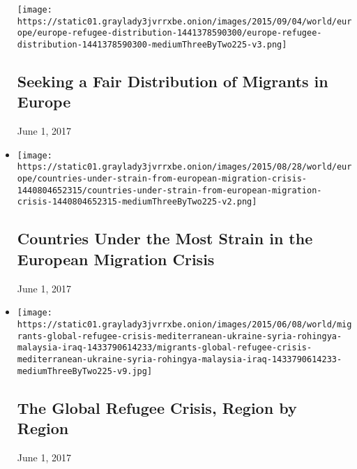 \begin{itemize}
  \texttt{[image: https://static01.graylady3jvrrxbe.onion/images/2015/09/04/world/europe/europe-refugee-distribution-1441378590300/europe-refugee-distribution-1441378590300-mediumThreeByTwo225-v3.png]}

  \hypertarget{seeking-a-fair-distribution-of-migrants-in-europe}{%
  \subsection{Seeking a Fair Distribution of Migrants in
  Europe}\label{seeking-a-fair-distribution-of-migrants-in-europe}}

  June 1, 2017
\item
  \href{https://www.nytimes3xbfgragh.onion/interactive/2015/08/28/world/europe/countries-under-strain-from-european-migration-crisis.html}{}

  \texttt{[image: https://static01.graylady3jvrrxbe.onion/images/2015/08/28/world/europe/countries-under-strain-from-european-migration-crisis-1440804652315/countries-under-strain-from-european-migration-crisis-1440804652315-mediumThreeByTwo225-v2.png]}

  \hypertarget{countries-under-the-most-strain-in-the-european-migration-crisis}{%
  \subsection{Countries Under the Most Strain in the European Migration
  Crisis}\label{countries-under-the-most-strain-in-the-european-migration-crisis}}

  June 1, 2017
\item
  \href{https://www.nytimes3xbfgragh.onion/interactive/2015/06/09/world/migrants-global-refugee-crisis-mediterranean-ukraine-syria-rohingya-malaysia-iraq.html}{}

  \texttt{[image: https://static01.graylady3jvrrxbe.onion/images/2015/06/08/world/migrants-global-refugee-crisis-mediterranean-ukraine-syria-rohingya-malaysia-iraq-1433790614233/migrants-global-refugee-crisis-mediterranean-ukraine-syria-rohingya-malaysia-iraq-1433790614233-mediumThreeByTwo225-v9.jpg]}

  \hypertarget{the-global-refugee-crisis-region-by-region}{%
  \subsection{The Global Refugee Crisis, Region by
  Region}\label{the-global-refugee-crisis-region-by-region}}

  June 1, 2017
\end{itemize}

